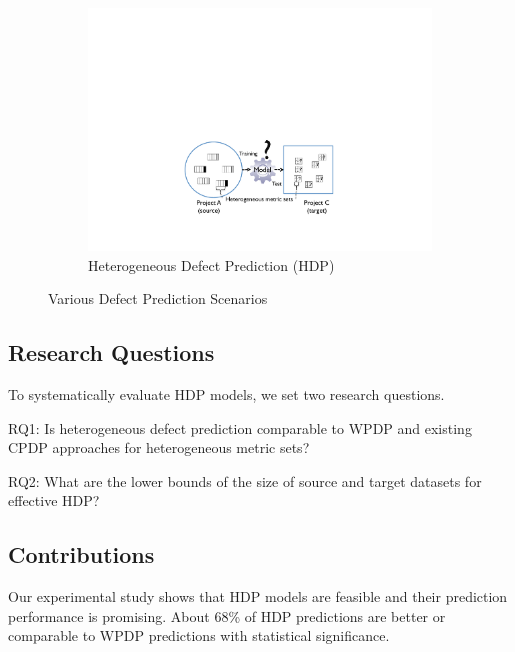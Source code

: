 \begin{figure}[t]
 \begin{subfigure}{0.8\linewidth}
 	\includegraphics[scale=0.5]{Figures/intro/p_crossdomain.pdf}
  	\caption{Heterogeneous Defect Prediction \tiny{(HDP)}}
   	\label{fig:subfig3}
 \end{subfigure}
 
 \label{fig:type_of_predictions}
 \caption{%
  Various Defect Prediction Scenarios
  }
\end{figure}

\subsection{Research Questions}
To systematically evaluate HDP models, we set
two research questions.
\squishlist
  \item RQ1: Is heterogeneous defect prediction comparable to WPDP and existing CPDP approaches for heterogeneous metric sets?
   \item RQ2: What are the  lower  bounds  of  the  size  of source and target  datasets  for  effective HDP?
\squishend
% 

\subsection{Contributions}
Our experimental study shows that HDP models are feasible and their prediction
performance is promising. About 68\% of HDP predictions
are better or comparable to WPDP predictions with statistical
significance.


